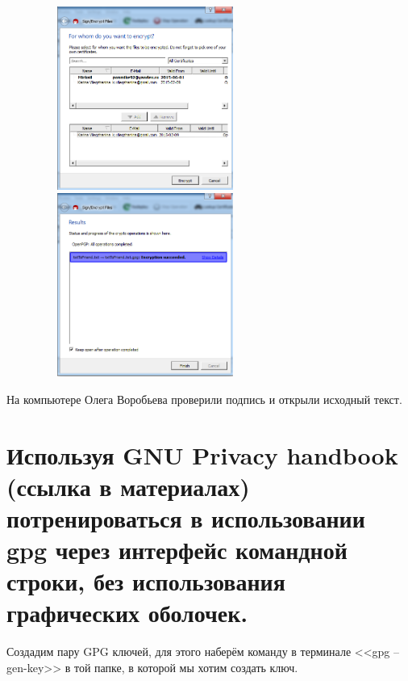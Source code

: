 \documentclass[utf8x, 12pt]{G7-32}
\begin{document}
\begin{figure}[hhh!]
	\begin{center}
		\includegraphics[width=7cm, height=6cm]{img/7_1}
		\includegraphics[width=7cm, height=6cm]{img/7_2}
	\end{center}
\end{figure}	

На компьютере Олега Воробьева проверили подпись и открыли исходный текст.

\newpage

\section{Используя GNU Privacy handbook (ссылка в материалах) потренироваться в использовании gpg через интерфейс командной строки, без использования графических оболочек.}


Создадим пару GPG ключей, для этого наберём команду в терминале <<gpg --gen-key>> в той папке, в которой мы хотим создать ключ.
\end{document}
